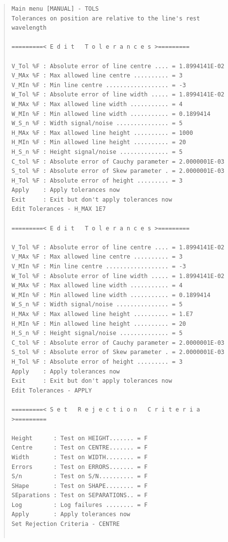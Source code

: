 \documentclass[11pt,twoside]{article}
\begin{document}
\begin{quote}\begin{verbatim}
Main menu [MANUAL] - TOLS
Tolerances on position are relative to the line's rest wavelength

=========< E d i t   T o l e r a n c e s >=========

V_Tol %F : Absolute error of line centre .... = 1.8994141E-02
V_MAx %F : Max allowed line centre .......... = 3
V_MIn %F : Min line centre .................. = -3
W_Tol %F : Absolute error of line width ..... = 1.8994141E-02
W_MAx %F : Max allowed line width ........... = 4
W_MIn %F : Min allowed line width ........... = 0.1899414
W_S_n %F : Width signal/noise ............... = 5
H_MAx %F : Max allowed line height .......... = 1000
H_MIn %F : Min allowed line height .......... = 20
H_S_n %F : Height signal/noise .............. = 5
C_tol %F : Absolute error of Cauchy parameter = 2.0000001E-03
S_tol %F : Absolute error of Skew parameter . = 2.0000001E-03
H_Tol %F : Absolute error of height ......... = 3
Apply    : Apply tolerances now
Exit     : Exit but don't apply tolerances now
Edit Tolerances - H_MAX 1E7

=========< E d i t   T o l e r a n c e s >=========

V_Tol %F : Absolute error of line centre .... = 1.8994141E-02
V_MAx %F : Max allowed line centre .......... = 3
V_MIn %F : Min line centre .................. = -3
W_Tol %F : Absolute error of line width ..... = 1.8994141E-02
W_MAx %F : Max allowed line width ........... = 4
W_MIn %F : Min allowed line width ........... = 0.1899414
W_S_n %F : Width signal/noise ............... = 5
H_MAx %F : Max allowed line height .......... = 1.E7
H_MIn %F : Min allowed line height .......... = 20
H_S_n %F : Height signal/noise .............. = 5
C_tol %F : Absolute error of Cauchy parameter = 2.0000001E-03
S_tol %F : Absolute error of Skew parameter . = 2.0000001E-03
H_Tol %F : Absolute error of height ......... = 3
Apply    : Apply tolerances now
Exit     : Exit but don't apply tolerances now
Edit Tolerances - APPLY

=========< S e t   R e j e c t i o n   C r i t e r i a >=========

Height      : Test on HEIGHT....... = F
Centre      : Test on CENTRE....... = F
Width       : Test on WIDTH........ = F
Errors      : Test on ERRORS....... = F
S/n         : Test on S/N.......... = F
SHape       : Test on SHAPE........ = F
SEparations : Test on SEPARATIONS.. = F
Log         : Log failures ........ = F
Apply       : Apply tolerances now
Set Rejection Criteria - CENTRE


\end{verbatim}
\end{quote}
\end{document}
